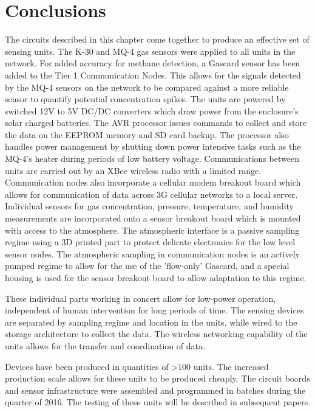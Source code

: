 \documentclass[journal]{IEEEtran}
\begin{document}

\section{Conclusions}

The circuits described in this chapter come together to produce an effective set of sensing units.  The K-30 and MQ-4 gas sensors were applied to all units in the network.  For added accuracy for methane detection, a Gascard sensor has been added to the Tier 1 Communication Nodes.  This allows for the signals detected by the MQ-4 sensors on the network to be compared against a more reliable sensor to quantify potential concentration spikes.  The units are powered by switched 12V to 5V DC/DC converters which draw power from the enclosure's solar charged batteries.  The AVR processor issues commands to collect and store the data on the EEPROM memory and SD card backup.  The processor also handles power management by shutting down power intensive tasks such as the MQ-4's heater during periods of low battery voltage.  Communications between units are carried out by an XBee wireless radio with a limited range.  Communication nodes also incorporate a cellular modem breakout board which allows for communication of data across 3G cellular networks to a local server.  Individual sensors for gas concentration, pressure, temperature, and humidity measurements are incorporated onto a sensor breakout board which is mounted with access to the atmosphere.  The atmospheric interface is a passive sampling regime using a 3D printed part to protect delicate electronics for the low level sensor nodes.  The atmospheric sampling in communication nodes is an actively pumped regime to allow for the use of the 'flow-only' Gascard, and a special housing is used for the sensor breakout board to allow adaptation to this regime.  

These individual parts working in concert allow for low-power operation, independent of human intervention for long periods of time.  The sensing devices are separated by sampling regime and location in the units, while wired to the storage architecture to collect the data.  The wireless networking capability of the units allows for the transfer and coordination of data.

Devices have been produced in quantities of \textgreater100 units.  The increased production scale allows for these units to be produced cheaply.  The circuit boards and sensor infrastructure were assembled and programmed in batches during the  quarter of 2016.  The testing of these units will be described in subsequent papers.  
 
\end{document}
